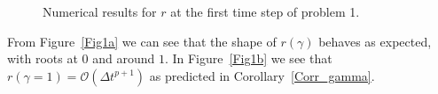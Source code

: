 \documentclass{article}
\begin{document}
    \begin{figure}[H]
        \centering
        \hfill
        \hfill
        \caption{Numerical results for \(r\) at the first time step of problem 1.} \label{Fig1}
    \end{figure}

    From Figure~\ref{Fig1a} we can see that the shape of \(r(\gamma)\) behaves as expected, with roots at \(0\) and around \(1\).
    In Figure~\ref{Fig1b} we see that \(r(\gamma = 1) = \mathcal{O}(\Delta t^{p+1})\) as predicted in Corollary~\ref{Corr_gamma}.
\end{document}
